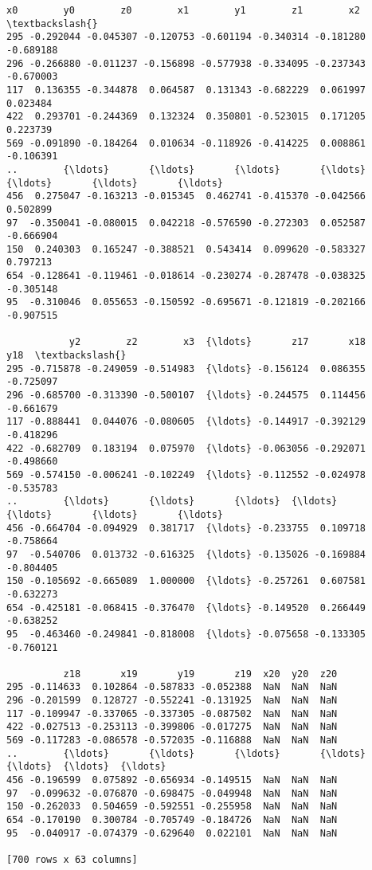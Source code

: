 \documentclass[11pt]{article}
\makeatletter
\newcommand{\boxspacing}{\kern\kvtcb@left@rule\kern\kvtcb@boxsep}
\newcommand{\prompt}[4]{
        {\ttfamily\llap{{\color{#2}[#3]:\hspace{3pt}#4}}\vspace{-\baselineskip}}
    }
\makeatother
\begin{document}
            \begin{tcolorbox}[breakable, size=fbox, boxrule=.5pt, pad at break*=1mm, opacityfill=0]
\prompt{Out}{outcolor}{11}{\boxspacing}
\begin{Verbatim}[commandchars=\\\{\}]
           x0        y0        z0        x1        y1        z1        x2  \textbackslash{}
295 -0.292044 -0.045307 -0.120753 -0.601194 -0.340314 -0.181280 -0.689188
296 -0.266880 -0.011237 -0.156898 -0.577938 -0.334095 -0.237343 -0.670003
117  0.136355 -0.344878  0.064587  0.131343 -0.682229  0.061997  0.023484
422  0.293701 -0.244369  0.132324  0.350801 -0.523015  0.171205  0.223739
569 -0.091890 -0.184264  0.010634 -0.118926 -0.414225  0.008861 -0.106391
..        {\ldots}       {\ldots}       {\ldots}       {\ldots}       {\ldots}       {\ldots}       {\ldots}
456  0.275047 -0.163213 -0.015345  0.462741 -0.415370 -0.042566  0.502899
97  -0.350041 -0.080015  0.042218 -0.576590 -0.272303  0.052587 -0.666904
150  0.240303  0.165247 -0.388521  0.543414  0.099620 -0.583327  0.797213
654 -0.128641 -0.119461 -0.018614 -0.230274 -0.287478 -0.038325 -0.305148
95  -0.310046  0.055653 -0.150592 -0.695671 -0.121819 -0.202166 -0.907515

           y2        z2        x3  {\ldots}       z17       x18       y18  \textbackslash{}
295 -0.715878 -0.249059 -0.514983  {\ldots} -0.156124  0.086355 -0.725097
296 -0.685700 -0.313390 -0.500107  {\ldots} -0.244575  0.114456 -0.661679
117 -0.888441  0.044076 -0.080605  {\ldots} -0.144917 -0.392129 -0.418296
422 -0.682709  0.183194  0.075970  {\ldots} -0.063056 -0.292071 -0.498660
569 -0.574150 -0.006241 -0.102249  {\ldots} -0.112552 -0.024978 -0.535783
..        {\ldots}       {\ldots}       {\ldots}  {\ldots}       {\ldots}       {\ldots}       {\ldots}
456 -0.664704 -0.094929  0.381717  {\ldots} -0.233755  0.109718 -0.758664
97  -0.540706  0.013732 -0.616325  {\ldots} -0.135026 -0.169884 -0.804405
150 -0.105692 -0.665089  1.000000  {\ldots} -0.257261  0.607581 -0.632273
654 -0.425181 -0.068415 -0.376470  {\ldots} -0.149520  0.266449 -0.638252
95  -0.463460 -0.249841 -0.818008  {\ldots} -0.075658 -0.133305 -0.760121

          z18       x19       y19       z19  x20  y20  z20
295 -0.114633  0.102864 -0.587833 -0.052388  NaN  NaN  NaN
296 -0.201599  0.128727 -0.552241 -0.131925  NaN  NaN  NaN
117 -0.109947 -0.337065 -0.337305 -0.087502  NaN  NaN  NaN
422 -0.027513 -0.253113 -0.399806 -0.017275  NaN  NaN  NaN
569 -0.117283 -0.086578 -0.572035 -0.116888  NaN  NaN  NaN
..        {\ldots}       {\ldots}       {\ldots}       {\ldots}  {\ldots}  {\ldots}  {\ldots}
456 -0.196599  0.075892 -0.656934 -0.149515  NaN  NaN  NaN
97  -0.099632 -0.076870 -0.698475 -0.049948  NaN  NaN  NaN
150 -0.262033  0.504659 -0.592551 -0.255958  NaN  NaN  NaN
654 -0.170190  0.300784 -0.705749 -0.184726  NaN  NaN  NaN
95  -0.040917 -0.074379 -0.629640  0.022101  NaN  NaN  NaN

[700 rows x 63 columns]
\end{Verbatim}
\end{tcolorbox}
        
\end{document}
